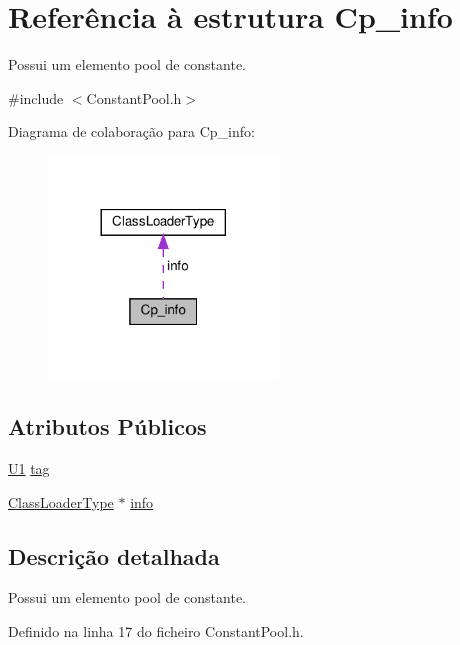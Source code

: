 \hypertarget{structCp__info}{}\section{Referência à estrutura Cp\+\_\+info}
\label{structCp__info}


Possui um elemento pool de constante.  




{\ttfamily \#include $<$Constant\+Pool.\+h$>$}



Diagrama de colaboração para Cp\+\_\+info\+:\nopagebreak
\begin{figure}[H]
\begin{center}
\leavevmode
\includegraphics[width=173pt]{structCp__info__coll__graph}
\end{center}
\end{figure}
\subsection*{Atributos Públicos}
\begin{DoxyCompactItemize}
\item 
\hyperlink{BasicTypes_8h_a9bffe5bb2564f91cd90fb7d06848f9a8}{U1} \hyperlink{structCp__info_a74ba6be7ad12511cc5df37e43984add0}{tag}
\item 
\hyperlink{unionClassLoaderType}{Class\+Loader\+Type} $\ast$ \hyperlink{structCp__info_ace48d3773256ae8a504dea48352c0b93}{info}
\end{DoxyCompactItemize}


\subsection{Descrição detalhada}
Possui um elemento pool de constante. 

Definido na linha 17 do ficheiro Constant\+Pool.\+h.



